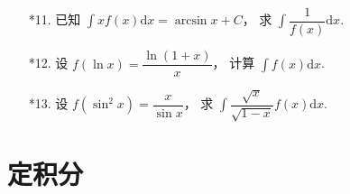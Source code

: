 \begin{enumerate}
    \item[*11.] 已知 $\displaystyle\int xf(x)\text{d}x=\arcsin x+C$，
    求 $\displaystyle\int\dfrac{1}{f(x)}\text{d}x$.

    \item[*12.] 设 $f(\ln x)=\dfrac{\ln(1+x)}{x}$，
    计算 $\displaystyle\int f(x)\text{d}x$.
    
    \item[*13.] 设 $f(\sin^2x)=\dfrac{x}{\sin x}$，
    求 $\displaystyle\int\dfrac{\sqrt{x}}{\sqrt{1-x}}f(x)\text{d}x$. 

\end{enumerate}

\section{定积分}

